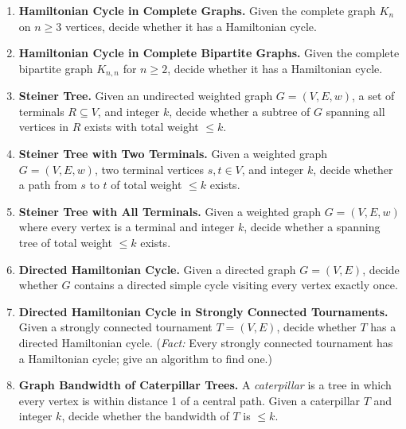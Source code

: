 \documentclass[9pt]{book}
\begin{document}
\begin{enumerate}[label=\arabic*.]
\item \textbf{Hamiltonian Cycle in Complete Graphs.}
Given the complete graph $K_n$ on $n\geq 3$ vertices, decide whether it has a Hamiltonian cycle.

\bigskip

\item \textbf{Hamiltonian Cycle in Complete Bipartite Graphs.}
Given the complete bipartite graph $K_{n,n}$ for $n\geq 2$, decide whether it has a Hamiltonian cycle.

\bigskip

\item \textbf{Steiner Tree.}
Given an undirected weighted graph $G=(V,E,w)$, a set of terminals $R\subseteq V$, and integer $k$, decide whether a subtree of $G$ spanning all vertices in $R$ exists with total weight $\leq k$.

\bigskip

\item \textbf{Steiner Tree with Two Terminals.}
Given a weighted graph $G=(V,E,w)$, two terminal vertices $s,t\in V$, and integer $k$, decide whether a path from $s$ to $t$ of total weight $\leq k$ exists.

\bigskip

\item \textbf{Steiner Tree with All Terminals.}
Given a weighted graph $G=(V,E,w)$ where every vertex is a terminal and integer $k$, decide whether a spanning tree of total weight $\leq k$ exists.

\bigskip

\item \textbf{Directed Hamiltonian Cycle.}
Given a directed graph $G=(V,E)$, decide whether $G$ contains a directed simple cycle visiting every vertex exactly once.

\bigskip

\item \textbf{Directed Hamiltonian Cycle in Strongly Connected Tournaments.}
Given a strongly connected tournament $T=(V,E)$, decide whether $T$ has a directed Hamiltonian cycle.
(\textit{Fact:} Every strongly connected tournament has a Hamiltonian cycle; give an algorithm to find one.)

\bigskip

\item \textbf{Graph Bandwidth of Caterpillar Trees.}
A \emph{caterpillar} is a tree in which every vertex is within distance 1 of a central path.
Given a caterpillar $T$ and integer $k$, decide whether the bandwidth of $T$ is $\leq k$.

\end{enumerate}
\end{document}
